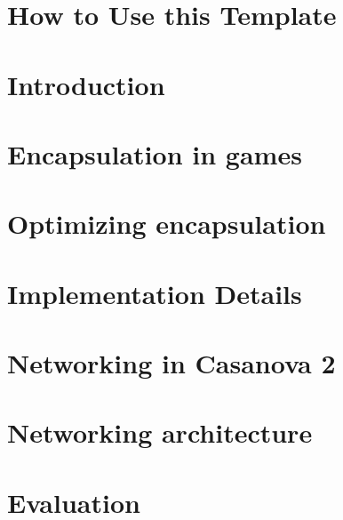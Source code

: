 \documentclass[computers,article,submit,moreauthors,pdftex,10pt,a4paper]{mdpi}
\theoremstyle{mdpi}
\newcounter{ex}
\newcounter{re}
\theoremstyle{mdpidefinition}
\begin{document}


\section{How to Use this Template}

\section{Introduction}
\label{sec:introduction}


\section{Encapsulation in games}
\label{sec:the_problem}



\section{Optimizing encapsulation}
\label{sec:idea}



\section{Implementation Details}
\label{sec:details}


\section{Networking in Casanova 2}
\label{sec:networking}



\section{Networking architecture}
\label{sec:net_architecture}


\section{Evaluation}
\label{sec:evaluation}

\end{document}
